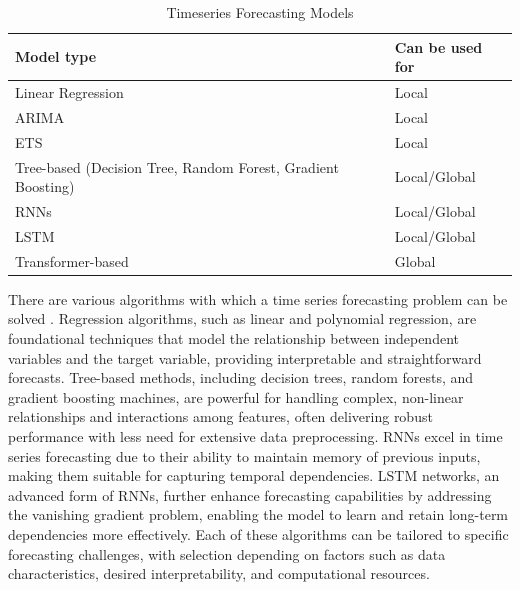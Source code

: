 \begin{table}[h]
    \centering
    \begin{tabular}{ll}
        \toprule
        \textbf{Model type}                                          & \textbf{Can be used for} \\
        \midrule
        Linear Regression                                            & Local                    \\
        \midrule
        \ac{ARIMA}                                                   & Local                    \\
        \midrule
        \ac{ETS}                                                     & Local                    \\
        \midrule
        Tree-based (Decision Tree, Random Forest, Gradient Boosting) & Local/Global             \\
        \midrule
        \ac{RNNs}                                                    & Local/Global             \\
        \midrule
        \ac{LSTM}                                                    & Local/Global             \\
        \midrule
        Transformer-based                                            & Global                   \\

        \bottomrule
    \end{tabular}
    \caption{Timeseries Forecasting Models}
    \label{tab:timeseries_models}
\end{table}

There are various algorithms with which a time series forecasting problem can be
solved \parencite{salinas2020deepar}. Regression algorithms, such as linear and
polynomial regression, are foundational techniques that model the relationship
between independent variables and the target variable, providing interpretable
and straightforward forecasts. Tree-based methods, including decision trees,
random forests, and gradient boosting machines, are powerful for handling complex,
non-linear relationships and interactions among features, often delivering robust
performance with less need for extensive data preprocessing. \ac{RNNs} excel in
time series forecasting due to their ability to maintain memory of previous inputs,
making them suitable for capturing temporal dependencies. \ac{LSTM} networks, an
advanced form of \ac{RNNs}, further enhance forecasting capabilities by addressing
the vanishing gradient problem, enabling the model to learn and retain long-term
dependencies more effectively. Each of these algorithms can be tailored to specific
forecasting challenges, with selection depending on factors such as data characteristics,
desired interpretability, and computational resources.

